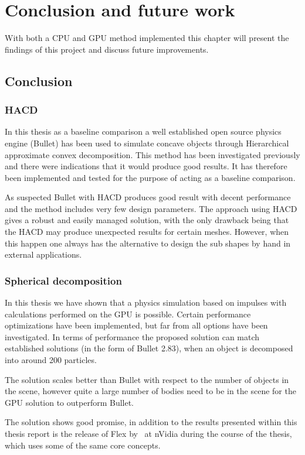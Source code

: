 \chapter{Conclusion and future work}
With both a CPU and GPU method implemented this chapter will present the findings
of this project and discuss future improvements.
\section{Conclusion}
\subsection{HACD}
In this thesis as a baseline comparison a well established open source physics engine
(Bullet) has been used to simulate concave objects through Hierarchical approximate
 convex decomposition. This method has been investigated previously and there were
 indications that it would produce good results. It has therefore been implemented
 and tested for the purpose of acting as a baseline comparison.

As suspected Bullet with HACD produces good result with decent performance and
the method includes very few design parameters. The approach using HACD gives
a robust and easily managed solution, with the only drawback being that the HACD
may produce unexpected results for certain meshes. However, when this happen
one always has the alternative to design the sub shapes by hand in external applications.

\subsection{Spherical decomposition}
In this thesis we have shown that a physics simulation based on impulses with
calculations performed on the GPU is possible. Certain performance optimizations
have been implemented, but far from all options have been investigated.
 In terms of performance the proposed solution can match established
solutions (in the form of Bullet 2.83), when an object is decomposed into around
200 particles.

The solution scales better than Bullet with respect to the number of objects in the scene,
however quite a large number of bodies need to be in the scene for the GPU solution to
outperform Bullet.

The solution shows good promise, in addition to the results presented within this
thesis report is the release of Flex by~\cite{flex} at nVidia
during the course of the thesis, which uses some of the same core concepts.


